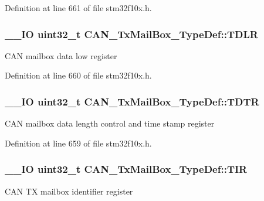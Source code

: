 Definition at line 661 of file stm32f10x.\-h.

\hypertarget{struct_c_a_n___tx_mail_box___type_def_a408c96501b1cc8bd527432736d132a39}{
\subsubsection[{T\-D\-L\-R}]{\setlength{\rightskip}{0pt plus 5cm}\-\_\-\-\_\-\-I\-O {\bf uint32\-\_\-t} C\-A\-N\-\_\-\-Tx\-Mail\-Box\-\_\-\-Type\-Def\-::\-T\-D\-L\-R}}\label{struct_c_a_n___tx_mail_box___type_def_a408c96501b1cc8bd527432736d132a39}
C\-A\-N mailbox data low register 

Definition at line 660 of file stm32f10x.\-h.

\hypertarget{struct_c_a_n___tx_mail_box___type_def_a2351cb865d064cf75f61642aaa887f76}{
\subsubsection[{T\-D\-T\-R}]{\setlength{\rightskip}{0pt plus 5cm}\-\_\-\-\_\-\-I\-O {\bf uint32\-\_\-t} C\-A\-N\-\_\-\-Tx\-Mail\-Box\-\_\-\-Type\-Def\-::\-T\-D\-T\-R}}\label{struct_c_a_n___tx_mail_box___type_def_a2351cb865d064cf75f61642aaa887f76}
C\-A\-N mailbox data length control and time stamp register 

Definition at line 659 of file stm32f10x.\-h.

\hypertarget{struct_c_a_n___tx_mail_box___type_def_a22f525c909de2dcec1d4093fe1d562b8}{
\subsubsection[{T\-I\-R}]{\setlength{\rightskip}{0pt plus 5cm}\-\_\-\-\_\-\-I\-O {\bf uint32\-\_\-t} C\-A\-N\-\_\-\-Tx\-Mail\-Box\-\_\-\-Type\-Def\-::\-T\-I\-R}}\label{struct_c_a_n___tx_mail_box___type_def_a22f525c909de2dcec1d4093fe1d562b8}
C\-A\-N T\-X mailbox identifier register 

